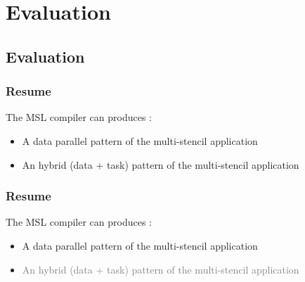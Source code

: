 \documentclass{beamer}
\begin{document}

 



\section{Evaluation}
\subsection{Evaluation}

\begin{frame}
\frametitle{Resume}
The MSL compiler can produces :
\begin{itemize}
\item A data parallel pattern of the multi-stencil application
\item An hybrid (data + task) pattern of the multi-stencil application
\end{itemize}
\end{frame}

\begin{frame}
\frametitle{Resume}
The MSL compiler can produces :
\begin{itemize}
\item A data parallel pattern of the multi-stencil application
\item \textcolor{gray}{An hybrid (data + task) pattern of the multi-stencil application}
\end{itemize}
\end{frame}
\end{document}
